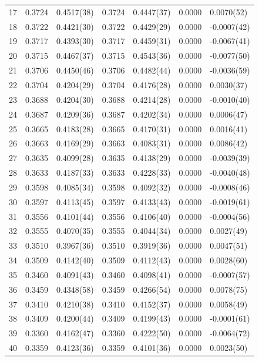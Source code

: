 \documentclass[aps, prc, tightenlines,superscriptaddress, letterpaper, amsmath, amssymb, preprintnumbers, floatfix, longbibliography, nofootinbib]{revtex4-2}
\begin{document}
\begin{table}[!htb]
{\begin{tabularx}{\textwidth}{| c || Y | Y | Y | Y | Y | Y |}
17	&	0.3724	&	0.4517(38)	&	0.3724	&	0.4447(37)	&	0.0000	&	0.0070(52)	\\
18	&	0.3722	&	0.4421(30)	&	0.3722	&	0.4429(29)	&	0.0000	&	-0.0007(42)	\\
19	&	0.3717	&	0.4393(30)	&	0.3717	&	0.4459(31)	&	0.0000	&	-0.0067(41)	\\
20	&	0.3715	&	0.4467(37)	&	0.3715	&	0.4543(36)	&	0.0000	&	-0.0077(50)	\\
21	&	0.3706	&	0.4450(46)	&	0.3706	&	0.4482(44)	&	0.0000	&	-0.0036(59)	\\
22	&	0.3704	&	0.4204(29)	&	0.3704	&	0.4176(28)	&	0.0000	&	0.0030(37)	\\
23	&	0.3688	&	0.4204(30)	&	0.3688	&	0.4214(28)	&	0.0000	&	-0.0010(40)	\\
24	&	0.3687	&	0.4209(36)	&	0.3687	&	0.4202(34)	&	0.0000	&	0.0006(47)	\\
25	&	0.3665	&	0.4183(28)	&	0.3665	&	0.4170(31)	&	0.0000	&	0.0016(41)	\\
26	&	0.3663	&	0.4169(29)	&	0.3663	&	0.4083(31)	&	0.0000	&	0.0086(42)	\\
27	&	0.3635	&	0.4099(28)	&	0.3635	&	0.4138(29)	&	0.0000	&	-0.0039(39)	\\
28	&	0.3633	&	0.4187(33)	&	0.3633	&	0.4228(33)	&	0.0000	&	-0.0040(48)	\\
29	&	0.3598	&	0.4085(34)	&	0.3598	&	0.4092(32)	&	0.0000	&	-0.0008(46)	\\
30	&	0.3597	&	0.4113(45)	&	0.3597	&	0.4133(43)	&	0.0000	&	-0.0019(61)	\\
31	&	0.3556	&	0.4101(44)	&	0.3556	&	0.4106(40)	&	0.0000	&	-0.0004(56)	\\
32	&	0.3555	&	0.4070(35)	&	0.3555	&	0.4044(34)	&	0.0000	&	0.0027(49)	\\
33	&	0.3510	&	0.3967(36)	&	0.3510	&	0.3919(36)	&	0.0000	&	0.0047(51)	\\
34	&	0.3509	&	0.4142(40)	&	0.3509	&	0.4112(43)	&	0.0000	&	0.0028(60)	\\
35	&	0.3460	&	0.4091(43)	&	0.3460	&	0.4098(41)	&	0.0000	&	-0.0007(57)	\\
36	&	0.3459	&	0.4348(58)	&	0.3459	&	0.4266(54)	&	0.0000	&	0.0078(75)	\\
37	&	0.3410	&	0.4210(38)	&	0.3410	&	0.4152(37)	&	0.0000	&	0.0058(49)	\\
38	&	0.3409	&	0.4200(44)	&	0.3409	&	0.4199(43)	&	0.0000	&	-0.0001(61)	\\
39	&	0.3360	&	0.4162(47)	&	0.3360	&	0.4222(50)	&	0.0000	&	-0.0064(72)	\\
40	&	0.3359	&	0.4123(36)	&	0.3359	&	0.4101(36)	&	0.0000	&	0.0023(50)	\\

\end{tabularx}}
\end{table}
\end{document}
